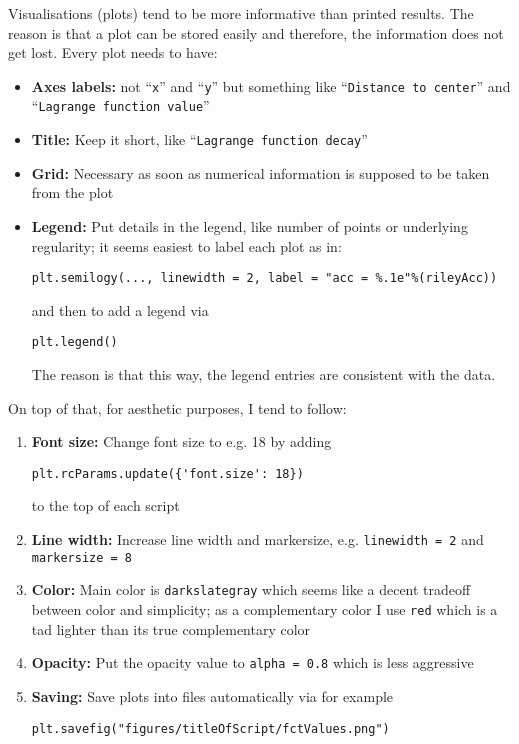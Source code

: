 \documentclass[12pt]{article}
\begin{document}
Visualisations (plots) tend to be more informative than printed results. The reason is that a plot can be stored easily and therefore, the information does not get lost. Every plot needs to have:
\begin{itemize}
\item \textbf{Axes labels:} not ``\texttt{x}'' and ``\texttt{y}'' but something like ``\texttt{Distance to center}'' and ``\texttt{Lagrange function value}''
\item \textbf{Title:} Keep it short, like ``\texttt{Lagrange function decay}''
\item \textbf{Grid:} Necessary as soon as numerical information is supposed to be taken from the plot
\item \textbf{Legend:} Put details in the legend, like number of points or underlying regularity; it seems easiest to label each plot as in:
\begin{Verbatim}[formatcom=\color{blue!50!black}]
plt.semilogy(..., linewidth = 2, label = "acc = %.1e"%(rileyAcc))
\end{Verbatim}
and then to add a legend via
\begin{Verbatim}[formatcom=\color{blue!50!black}]
plt.legend()
\end{Verbatim}
The reason is that this way, the legend entries are consistent with the data.
\end{itemize}
On top of that, for aesthetic purposes, I tend to follow:
\begin{enumerate}
\item \textbf{Font size:} Change font size to e.g. 18 by adding
\begin{Verbatim}[formatcom=\color{blue!50!black}]
plt.rcParams.update({'font.size': 18})
\end{Verbatim}
to the top of each script
\item \textbf{Line width:} Increase line width and markersize, e.g. \verb+linewidth = 2+ and \verb+markersize = 8+
\item \textbf{Color:} Main color is \texttt{darkslategray} which seems like a decent tradeoff between color and simplicity; as a complementary color I use \texttt{red} which is a tad lighter than its true complementary color
\item \textbf{Opacity:} Put the opacity value to \verb+alpha = 0.8+ which is less aggressive
\item \textbf{Saving:} Save plots into files automatically via for example
\begin{Verbatim}[formatcom=\color{blue!50!black}]
plt.savefig("figures/titleOfScript/fctValues.png")
\end{Verbatim}

\end{enumerate}
\end{document}
